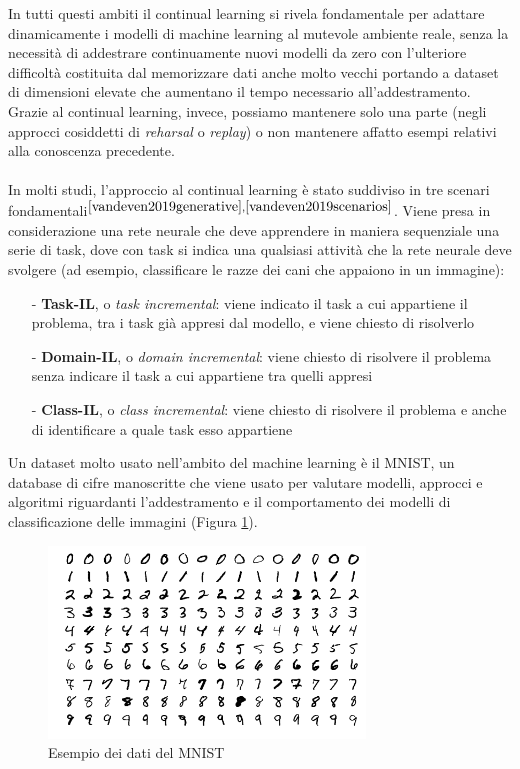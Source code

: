 In tutti questi ambiti il continual learning si rivela fondamentale per adattare dinamicamente i modelli di machine learning al mutevole ambiente reale, senza la necessità di addestrare continuamente nuovi modelli da zero con l'ulteriore difficoltà costituita dal memorizzare dati anche molto vecchi portando a dataset di dimensioni elevate che aumentano il tempo necessario all'addestramento. Grazie al continual learning, invece, possiamo mantenere solo una parte (negli approcci cosiddetti di \textit{reharsal} o \textit{replay}) o non mantenere affatto esempi relativi alla conoscenza precedente.\\\\
In molti studi, l'approccio al continual learning è stato suddiviso in tre scenari fondamentali$^{\cite{vandeven2019generative},\cite{vandeven2019scenarios}}$. Viene presa in considerazione una rete neurale che deve apprendere in maniera sequenziale una serie di task, dove con task si indica una qualsiasi attività che la rete neurale deve svolgere (ad esempio, classificare le razze dei cani che appaiono in un immagine):
\begin{itemize}
    \item[-] \textbf{Task-IL}, o \textit{task incremental}: viene indicato il task a cui appartiene il problema, tra i task già appresi dal modello, e viene chiesto di risolverlo
    \item[-] \textbf{Domain-IL}, o \textit{domain incremental}: viene chiesto di risolvere il problema senza indicare il task a cui appartiene tra quelli appresi
    \item[-] \textbf{Class-IL}, o \textit{class incremental}: viene chiesto di risolvere il problema e anche di identificare a quale task esso appartiene
\end{itemize}
Un dataset molto usato nell'ambito del machine learning è il MNIST, un database di cifre manoscritte che viene usato per valutare modelli, approcci e algoritmi riguardanti l'addestramento e il comportamento dei modelli di classificazione delle immagini (Figura \ref{fig:mnistexamples}).
\begin{figure}[h]
	\begin{center}
		\includegraphics[width=0.75\textwidth]{img/MnistExamples.png}
		\caption{Esempio dei dati del MNIST}
		\label{fig:mnistexamples}
	\end{center}
\end{figure}
